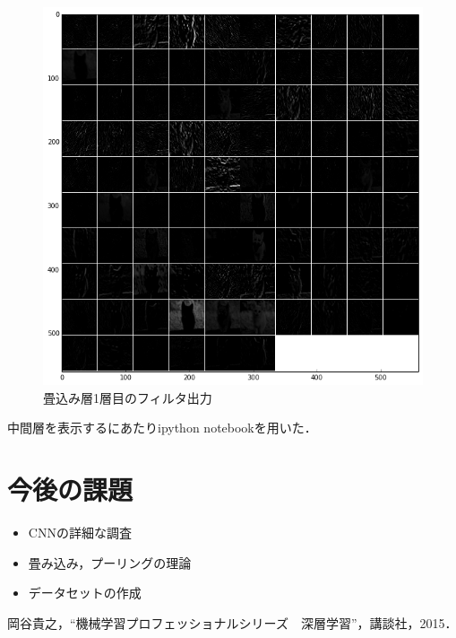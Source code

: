 \documentclass[a4paper,10pt]{jsarticle}
\begin{document}
\begin{figure}[t]
 \centering
 \includegraphics[scale=0.4]{fig/png/conv1_blobs.png}
  \caption{畳込み層1層目のフィルタ出力}
  \label{220458_1Jul15}
\end{figure}
中間層を表示するにあたりipython notebookを用いた．
\section{今後の課題}
\begin{itemize}
 \item CNNの詳細な調査
 \item 畳み込み，プーリングの理論
 \item データセットの作成
\end{itemize}


\begin{thebibliography}{99}
  岡谷貴之，``機械学習プロフェッショナルシリーズ　深層学習''，講談社，2015．
 \end{thebibliography}
\end{document}
